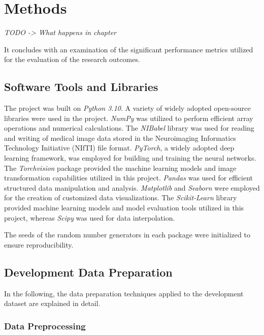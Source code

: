\section{Methods}
\label{sec:methods}

\textit{TODO -> What happens in chapter}

It concludes with an examination of the significant performance metrics utilized for the evaluation of 
the research outcomes.

\subsection{Software Tools and Libraries}
\label{subsec:libs}


The project was built on \textit{Python 3.10}.
A variety of widely adopted open-source libraries were used in the project.
\textit{NumPy} was utilized to perform efficient array operations and numerical calculations.
The \textit{NIBabel} library was used for reading and writing of medical image data stored in the
Neuroimaging Informatics Technology Initiative (NIfTI) file format.
\textit{PyTorch}, a widely adopted deep learning framework, was employed for building 
and training the neural networks.
The \textit{Torchvision} package provided the machine learning models and image transformation capabilities 
utilized in this project.
\textit{Pandas} was used for efficient structured data manipulation and analysis.
\textit{Matplotlib} and \textit{Seaborn} were employed for the creation of customized data visualizations.
The \textit{Scikit-Learn} library provided machine learning models and model evaluation tools utilized in this project, 
whereas \textit{Scipy} was used for data interpolation.

The seeds of the random number generators in each package were initialized to ensure reproducibility.

\subsection{Development Data Preparation}

In the following, the data preparation techniques applied to the development dataset are explained in detail.

\subsubsection{Data Preprocessing}
\label{subsubsec:img_preprocess_dev}

